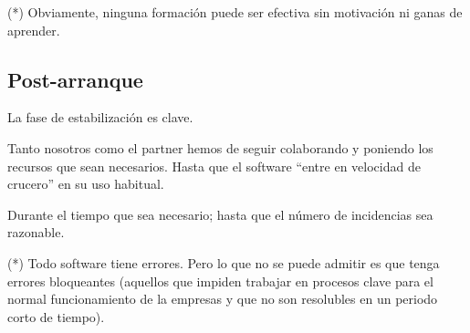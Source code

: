 \documentclass[spanish,12pt,a4paper,final,oneside]{article}
\begin{document}
(*) Obviamente, ninguna formación puede ser efectiva sin motivación ni ganas de aprender.



\subsection{Post-arranque}
La fase de estabilización es clave.

Tanto nosotros como el partner hemos de seguir colaborando y poniendo los recursos que sean necesarios. Hasta que el software ``entre en velocidad de crucero'' en su uso habitual.

Durante el tiempo que sea necesario; hasta que el número de incidencias sea razonable.

(*) Todo software tiene errores. Pero lo que no se puede admitir es que tenga errores bloqueantes (aquellos que impiden trabajar en procesos clave para el normal funcionamiento de la empresas y que no son resolubles en un periodo corto de tiempo).
\end{document}
